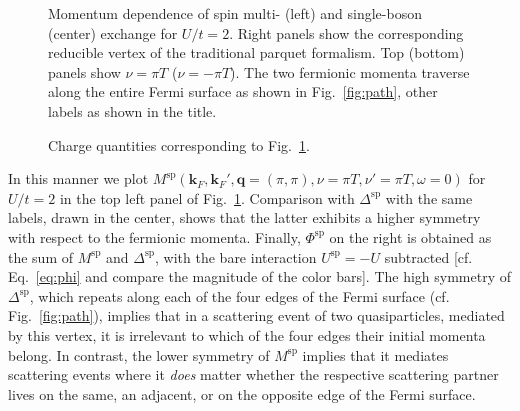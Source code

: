 \documentclass[epj]{svjour}
\newcommand{\kv}{\ensuremath{\mathbf{k}}}
\newcommand{\qv}{\ensuremath{\mathbf{q}}}
\newcommand{\sz}{\ensuremath{\text{sp}}}
\begin{document}
\begin{figure}
  \begin{center}
\end{center}
    \caption{\label{fig:u2spqpi} Momentum dependence of spin multi- (left) and single-boson (center)
    exchange for $U/t=2$. Right panels show the corresponding
    reducible vertex of the traditional parquet formalism.
    Top (bottom) panels show $\nu=\pi T$ ($\nu=-\pi T$).
    The two fermionic momenta traverse along the entire Fermi surface as shown in Fig.~\ref{fig:path},
    other labels as shown in the title.}
\end{figure}

\begin{figure}
  \begin{center}
\end{center}
    \caption{\label{fig:u2chqpi} Charge quantities corresponding to Fig.~\ref{fig:u2spqpi}.}
\end{figure}

In this manner we plot $M^\sz(\kv_F,\kv_F',\qv=(\pi,\pi),\nu=\pi T,\nu'=\pi T,\omega=0)$
for $U/t=2$ in the top left panel of Fig.~\ref{fig:u2spqpi}. 
Comparison with $\Delta^\sz$ with the same labels, drawn in the center,
shows that the latter exhibits a higher symmetry with respect to the fermionic momenta.
Finally, $\Phi^\sz$ on the right is obtained as the sum of $M^\sz$ and $\Delta^\sz$,
with the bare interaction $U^\sz=-U$ subtracted
[cf. Eq.~\eqref{eq:phi} and compare the magnitude of the color bars]. The high symmetry of $\Delta^\sz$,
which repeats along each of the four edges of the Fermi surface (cf. Fig.~\ref{fig:path}),
implies that in a scattering event of two quasiparticles,
mediated by this vertex, it is irrelevant to which of the four edges their initial momenta belong.
In contrast, the lower symmetry of $M^\sz$ implies that it mediates scattering events
where it {\sl does} matter whether the respective scattering partner
lives on the same, an adjacent, or on the opposite edge of the Fermi surface.
\end{document}
